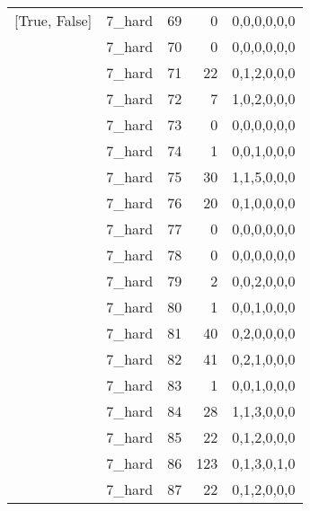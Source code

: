 \begin{tabular}{llrrl}
 [True, False]   & 7\_hard              &            69 &                     0 & 0,0,0,0,0,0   \\
 [True, False]   & 7\_hard              &            70 &                     0 & 0,0,0,0,0,0   \\
 [True, False]   & 7\_hard              &            71 &                    22 & 0,1,2,0,0,0   \\
 [True, False]   & 7\_hard              &            72 &                     7 & 1,0,2,0,0,0   \\
 [True, False]   & 7\_hard              &            73 &                     0 & 0,0,0,0,0,0   \\
 [True, False]   & 7\_hard              &            74 &                     1 & 0,0,1,0,0,0   \\
 [True, False]   & 7\_hard              &            75 &                    30 & 1,1,5,0,0,0   \\
 [True, False]   & 7\_hard              &            76 &                    20 & 0,1,0,0,0,0   \\
 [True, False]   & 7\_hard              &            77 &                     0 & 0,0,0,0,0,0   \\
 [True, False]   & 7\_hard              &            78 &                     0 & 0,0,0,0,0,0   \\
 [True, False]   & 7\_hard              &            79 &                     2 & 0,0,2,0,0,0   \\
 [True, False]   & 7\_hard              &            80 &                     1 & 0,0,1,0,0,0   \\
 [True, False]   & 7\_hard              &            81 &                    40 & 0,2,0,0,0,0   \\
 [True, False]   & 7\_hard              &            82 &                    41 & 0,2,1,0,0,0   \\
 [True, False]   & 7\_hard              &            83 &                     1 & 0,0,1,0,0,0   \\
 [True, False]   & 7\_hard              &            84 &                    28 & 1,1,3,0,0,0   \\
 [True, False]   & 7\_hard              &            85 &                    22 & 0,1,2,0,0,0   \\
 [True, False]   & 7\_hard              &            86 &                   123 & 0,1,3,0,1,0   \\
 [True, False]   & 7\_hard              &            87 &                    22 & 0,1,2,0,0,0   \\

\end{tabular}
